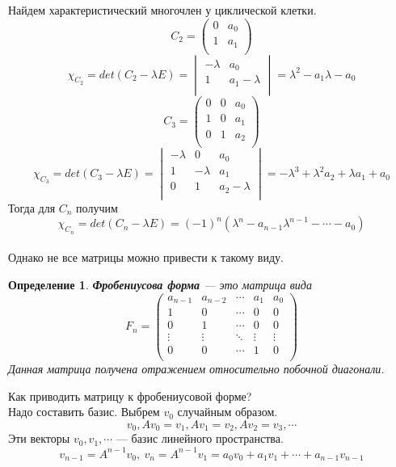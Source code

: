 \documentclass[12pt]{article}
\newtheorem*{definition}{Определение}
\begin{document}
	Найдем характеристический многочлен у циклической клетки.\\
	\[C_2=\begin{pmatrix}
	0 & a_0 \\
	1 & a_1 \\
	\end{pmatrix}\]
	\[\chi_{C_2}= det(C_2-\lambda E)=\begin{vmatrix}
	-\lambda & a_0 \\
	1 & a_1-\lambda \\
	\end{vmatrix}=\lambda^2-a_1\lambda-a_0\]
	\[C_3=\begin{pmatrix}
	0 & 0 & a_0 \\
	1 &  0 & a_1 \\
	0 & 1 & a_2 \\
	\end{pmatrix}\]
	\[\chi_{C_3}= det(C_3-\lambda E)=\begin{vmatrix}
	-\lambda & 0 & a_0 \\
	1 & -\lambda & a_1\\
	0 & 1 & a_2-\lambda \\
	\end{vmatrix}=-\lambda^3+\lambda^2a_2+\lambda a_1+a_0\]
	Тогда для $C_n$ получим
	$$\chi_{C_n}=det(C_n-\lambda E)=(-1)^n(\lambda^n-a_{n-1}\lambda^{n-1}-\cdots-a_0)$$
	\\
	Однако не все матрицы можно привести к такому виду.
	\begin{definition}
		\textbf{Фробениусова форма} --- это матрица вида
	\[F_n=\begin{pmatrix}
	a_{n-1} & a_{n-2} & \cdots & a_1 & a_0 \\
	1 & 0 & \cdots & 0 & 0 \\
	0 & 1 & \cdots & 0 & 0 \\
	\vdots & \vdots & \ddots & \vdots & \vdots \\
	0 & 0 & \cdots & 1 & 0 \\
	\end{pmatrix}\]
	Данная матрица получена отражением относительно побочной диагонали.
	\end{definition}
	Как приводить матрицу к фробениусовой форме?\\
	Надо составить базис. Выбрем $v_0$ случайным образом.\\
	$$v_0, Av_0=v_1, Av_1=v_2, Av_2=v_3,\cdots$$
	Эти векторы $v_0, v_1,\cdots$ --- базис линейного пространства.\\
	$$v_{n-1}=A^{n-1}v_0,~v_n=A^{n-1}v_1=a_0v_0+a_1v_1+\cdots +a_{n-1}v_{n-1}$$
\end{document}
